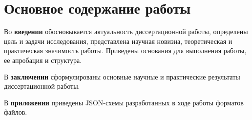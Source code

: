 
\section*{Основное содержание работы}
Во {\bf введении}
обосновывается актуальность диссертационной работы,
определены цель и задачи исследования,
представлена научная новизна, теоретическая и практическая значимость работы.
Приведены основания для выполнения работы, ее апробация и структура.







В {\bf заключении}
сформулированы основные научные и практические результаты
диссертационной работы.

В {\bf приложении}
приведены
JSON-схемы разработанных
в ходе работы форматов файлов.

